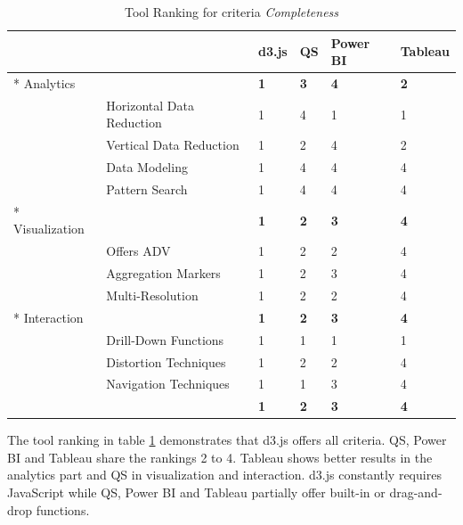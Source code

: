 \begin{table}[H]

    \begin{tabular}{|l| l l l l l|}
        \hline
        \multicolumn{2}{|c}{}   & d3.js  & \gls{QS}    & Power BI & Tableau\\\hline
        \rowcolor{gray!30}\multirow{5}*{\cellcolor{white} Analytics}
        &   & \textbf{1} & \textbf{3} & \textbf{4} & \textbf{2}\\\cline{2-6}
        & Horizontal Data Reduction     & 1 & 4 & 1 & 1\\
        & Vertical Data Reduction       & 1 & 2 & 4 & 2\\
        & Data Modeling                 & 1 & 4 & 4 & 4\\
        & Pattern Search                & 1 & 4 & 4 & 4\\
        \hline
        \rowcolor{gray!30} \multirow{3}*{\cellcolor{white} Visualization}
        &     & \textbf{1} & \textbf{2} & \textbf{3} & \textbf{4}\\\cline{2-6}
        & Offers ADV            & 1 & 2 & 2 & 4 \\
        & Aggregation Markers   & 1 & 2 & 3 & 4 \\
        & Multi-Resolution      & 1 & 2 & 2 & 4  \\
        
        \hline
        \rowcolor{gray!30}\multirow{3}*{\cellcolor{white} Interaction}
        &   & \textbf{1} & \textbf{2} & \textbf{3} & \textbf{4}\\\cline{2-6}
        & Drill-Down Functions  & 1 & 1 & 1 & 1    \\
        & Distortion Techniques & 1 & 2 & 2 & 4    \\        
        & Navigation Techniques & 1 & 1 & 3 & 4    \\
        \hline
        \hline
        \multicolumn{2}{|c}{}   & \textbf{1}  & \textbf{2}  & \textbf{3} & \textbf{4}\\
        \hline
    \end{tabular}
    \caption[Tool Ranking for Completeness]{Tool Ranking for criteria \textit{Completeness}}
    \label{table:rankingC}
    \end{table}
    
     The tool ranking in table \ref{table:rankingC} demonstrates that d3.js offers all criteria. \gls{QS}, Power BI and Tableau share the rankings 2 to 4. Tableau shows better results in the analytics part and \gls{QS} in visualization and interaction. d3.js constantly requires JavaScript while \gls{QS}, Power BI and Tableau partially offer built-in or drag-and-drop functions. 

    




